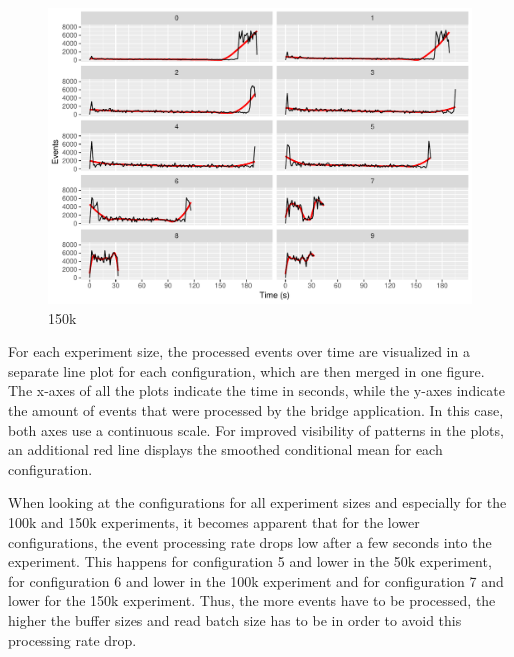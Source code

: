 \begin{figure}[h]
        \includegraphics[width=\textwidth]{gfx/config-comparison_150k.pdf}
        \caption{150k}
        \label{fig:evaluation:performance:config-comparison_150k}
\end{figure}

For each experiment size, the processed events over time are visualized in a separate line plot for each configuration, which are then merged in one figure.
The x-axes of all the plots indicate the time in seconds, while the y-axes indicate the amount of events that were processed by the bridge application.
In this case, both axes use a continuous scale.
For improved visibility of patterns in the plots, an additional red line displays the smoothed conditional mean for each configuration.

When looking at the configurations for all experiment sizes and especially for the 100k and 150k experiments, it becomes apparent that for the lower configurations, the event processing rate drops low after a few seconds into the experiment.
This happens for configuration 5 and lower in the 50k experiment, for configuration 6 and lower in the 100k experiment and for configuration 7 and lower for the 150k experiment.
Thus, the more events have to be processed, the higher the buffer sizes and read batch size has to be in order to avoid this processing rate drop.

